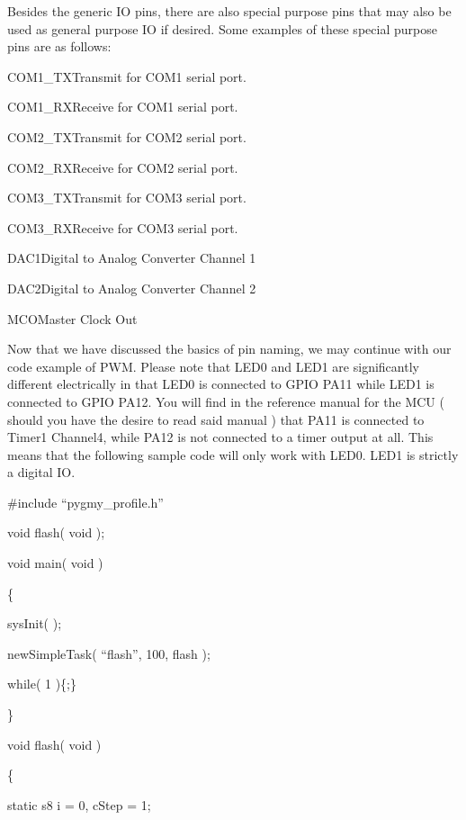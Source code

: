 \documentclass{article}
\begin{document}
Besides the generic IO pins, there are also special purpose pins that may also be used as general purpose IO if desired. Some examples of these special purpose pins are as follows:

COM1\_TXTransmit for COM1 serial port.

COM1\_RXReceive for COM1 serial port.

COM2\_TXTransmit for COM2 serial port.

COM2\_RXReceive for COM2 serial port.

COM3\_TXTransmit for COM3 serial port.

COM3\_RXReceive for COM3 serial port.

DAC1Digital to Analog Converter Channel 1

DAC2Digital to Analog Converter Channel 2

MCOMaster Clock Out


\bigskip

Now that we have discussed the basics of pin naming, we may continue with our code example of PWM. Please note that LED0 and LED1 are significantly different electrically in that LED0 is connected to GPIO PA11 while LED1 is connected to GPIO PA12. You will find in the reference manual for the MCU ( should you have the desire to read said manual ) that PA11 is connected to Timer1 Channel4, while PA12 is not connected to a timer output at all. This means that the following sample code will only work with LED0. LED1 is strictly a digital IO.


\bigskip


\bigskip

\#include {\textquotedblleft}pygmy\_profile.h{\textquotedblright}


\bigskip

void flash( void );


\bigskip

void main( void )

\{

sysInit( );

newSimpleTask( {\textquotedblleft}flash{\textquotedblright}, 100, flash );


\bigskip

while( 1 )\{;\}

\}


\bigskip


\bigskip

void flash( void )

\{

static s8 i = 0, cStep = 1;
\end{document}
